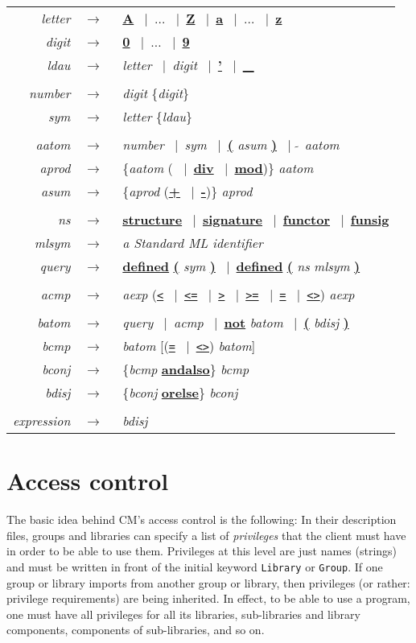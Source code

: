\documentclass{article}
\newcommand{\nt}[1]{{\it #1}}
\newcommand{\tl}[1]{{\underline{\bf #1}}}
\newcommand{\ttl}[1]{{\underline{\tt #1}}}
\newcommand{\ar}{$\rightarrow$\ }
\newcommand{\vb}{~$|$~}
\begin{document}
\begin{tabular}{rcl}
\nt{letter} &\ar& \tl{A} \vb $\ldots$ \vb \tl{Z} \vb \tl{a} \vb $\ldots$ \vb \tl{z} \\
\nt{digit}  &\ar& \tl{0} \vb $\ldots$ \vb \tl{9} \\
\nt{ldau}   &\ar& \nt{letter} \vb \nt{digit} \vb \tl{'} \vb \tl{\_} \\
\\
\nt{number} &\ar& \nt{digit} \{\nt{digit}\} \\
\nt{sym}    &\ar& \nt{letter} \{\nt{ldau}\} \\
\\
\nt{aatom}  &\ar& \nt{number} \vb \nt{sym} \vb \tl{(} \nt{asum} \tl{)} \vb \tl{$\tilde{~}$} \nt{aatom} \\
\nt{aprod}  &\ar& \{\nt{aatom} (\tl{*} \vb \tl{div} \vb \tl{mod})\} \nt{aatom} \\
\nt{asum}   &\ar& \{\nt{aprod} (\tl{+} \vb \tl{-})\} \nt{aprod} \\
\\
\nt{ns}     &\ar& \tl{structure} \vb \tl{signature} \vb \tl{functor} \vb \tl{funsig} \\
\nt{mlsym}  &\ar& {\em a Standard ML identifier} \\
\nt{query}  &\ar& \tl{defined} \tl{(} \nt{sym} \tl{)} \vb \tl{defined} \tl{(} \nt{ns} \nt{mlsym} \tl{)} \\
\\
\nt{acmp}   &\ar& \nt{aexp} (\ttl{<} \vb \ttl{<=} \vb \ttl{>} \vb \ttl{>=} \vb \ttl{=} \vb \ttl{<>}) \nt{aexp} \\
\\
\nt{batom}  &\ar& \nt{query} \vb \nt{acmp} \vb \tl{not} \nt{batom} \vb \tl{(} \nt{bdisj} \tl{)} \\
\nt{bcmp}   &\ar& \nt{batom} [(\ttl{=} \vb \ttl{<>}) \nt{batom}] \\
\nt{bconj}  &\ar& \{\nt{bcmp} \tl{andalso}\} \nt{bcmp} \\
\nt{bdisj}  &\ar& \{\nt{bconj} \tl{orelse}\} \nt{bconj} \\
\\
\nt{expression} &\ar& \nt{bdisj}
\end{tabular}

\section{Access control}
\label{sec:access}

The basic idea behind CM's access control is the following: In their
description files, groups and libraries can specify a list of
{\em privileges} that the client must have in order to be able to use them.
Privileges at this level are just names (strings) and must be written
in front of the initial keyword {\tt Library} or {\tt Group}.  If one
group or library imports from another group or library, then
privileges (or rather: privilege requirements) are being inherited.
In effect, to be able to use a program, one must have all privileges
for all its libraries, sub-libraries and library components,
components of sub-libraries, and so on.
\end{document}
